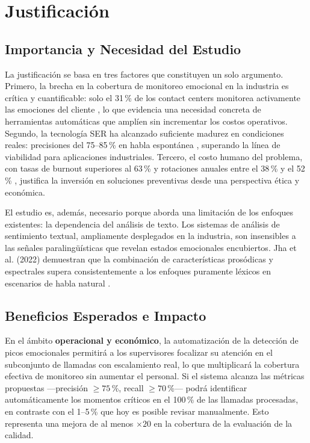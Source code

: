 \section{Justificación}

\subsection{Importancia y Necesidad del Estudio}

La justificación se basa en tres factores que constituyen un solo argumento. Primero,
la brecha en la cobertura de monitoreo emocional en la industria es crítica y
cuantificable: solo el 31\,\% de los contact centers monitorea activamente las
emociones del cliente \cite{zoom2025}, lo que evidencia una necesidad concreta de
herramientas automáticas que amplíen sin incrementar los costos operativos. Segundo,
la tecnología SER ha alcanzado suficiente madurez en condiciones reales: precisiones
del 75--85\,\% en habla espontánea \cite{abdelhamid2022, wagner2023}, superando la
línea de viabilidad para aplicaciones industriales. Tercero, el costo humano del
problema, con tasas de burnout superiores al 63\,\% \cite{sqm2023} y rotaciones
anuales entre el 38\,\% y el 52\,\% \cite{hiringbranch2024}, justifica la inversión en
soluciones preventivas desde una perspectiva ética y económica.

El estudio es, además, necesario porque aborda una limitación de los enfoques
existentes: la dependencia del análisis de texto. Los sistemas de análisis de
sentimiento textual, ampliamente desplegados en la industria, son insensibles a las
señales paralingüísticas que revelan estados emocionales encubiertos. Jha et al.
(2022) demuestran que la combinación de características prosódicas y espectrales
supera consistentemente a los enfoques puramente léxicos en escenarios de habla
natural \cite{jha2022}.

\subsection{Beneficios Esperados e Impacto}

En el ámbito \textbf{operacional y económico}, la automatización de la detección de
picos emocionales permitirá a los supervisores focalizar su atención en el subconjunto
de llamadas con escalamiento real, lo que multiplicará la cobertura efectiva de
monitoreo sin aumentar el personal. Si el sistema alcanza las métricas propuestas
—precisión $\geq 75$\,\%, recall $\geq 70$\,\%— podrá identificar automáticamente los
momentos críticos en el 100\,\% de las llamadas procesadas, en contraste con el
1--5\,\% que hoy es posible revisar manualmente. Esto representa una mejora de al
menos $\times 20$ en la cobertura de la evaluación de la calidad.

